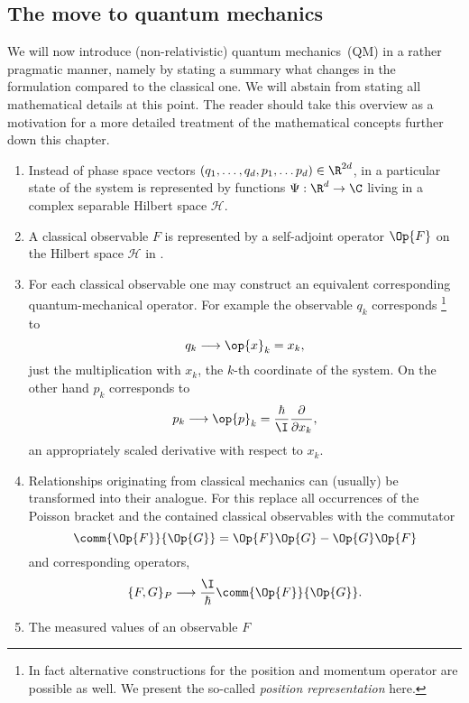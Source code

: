 \subsection{The move to quantum mechanics}
\label{sec:IntroQM}
\defineabbr{QM}{QM\xspace}{quantum mechanics}
We will now introduce (non-relativistic)
quantum mechanics~(QM) in a rather pragmatic manner,
namely by stating a summary what changes in the \QM formulation
compared to the classical one.
We will abstain from stating all mathematical details at this point.
The reader should take this overview as a motivation
for a more detailed treatment of the mathematical concepts
further down this chapter.

\newcommand{\hilbert}{\mathcal{H}}
\begin{enumerate}
	\item Instead of phase space vectors $\clphase \in \R^{2d}$,
		in \QM a particular state of the system is represented
		by functions $\Psi : \R^d \to \C$
		living in a complex separable Hilbert space $\hilbert$.
	\item A classical observable $F$ is represented by a
		self-adjoint operator $\Op{F}$ on the Hilbert space $\hilbert$ in \QM.
	\item For each classical observable one may construct an equivalent
		corresponding quantum-mechanical operator.
		For example the observable $q_k$ corresponds%
		\footnote{In fact alternative constructions for the position and momentum
				operator are possible as well. We present the so-called
				\textit{position representation} here.}
		to~\cite{Shankar1994, Mueller2000}
		\[ q_k \longrightarrow \op{x}_k = x_k, \]
		\ie just the multiplication with $x_k$,
		the $k$-th coordinate of the system.
		On the other hand $p_k$ corresponds to~\cite{Shankar1994, Mueller2000}
		\[ p_k \longrightarrow \op{p}_k
			= \frac{\hbar}{\I} \frac{\partial}{\partial x_k}, \]
		an appropriately scaled derivative with respect to $x_k$.
	\item Relationships originating from classical mechanics
		can (usually) be transformed into their \QM analogue.
		For this replace all occurrences of the Poisson bracket
		and the contained classical observables with the commutator
		\begin{equation}
			\comm{\Op{F}}{\Op{G}} = \Op{F} \Op{G} - \Op{G} \Op{F}
			\label{eqn:Operator}
		\end{equation}
		and corresponding operators, \ie~\cite{Shankar1994}
		\[ \{F, G\}_P \longrightarrow \frac{\I}{\hbar} \comm{\Op{F}}{\Op{G}}. \]
	\item The measured values of an observable $F$

\end{enumerate}
